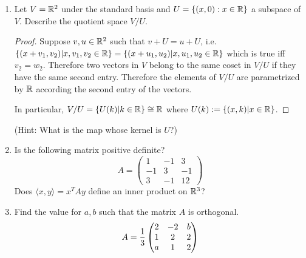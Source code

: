 \documentclass{amsart}
\begin{document}
\begin{enumerate}
(Hint: give an example of two non-invertible maps that sums to an invertible map. You might try to use some theorems to do this in terms of matrices).

\begin{proof}\color{blue}
	Consider $A=\begin{pmatrix}
		1&0\\0&0
	\end{pmatrix}$ and $B=\begin{pmatrix}
		0&0\\0&1
	\end{pmatrix}$. Both $A,B$ are singular (non-invertible), but $A+B=I$ is invertible.
	
	So the set of non-invertible maps is not closed under addition.
\end{proof}

\item Let $V=\mathbb{R}^2$ under the standard basis and $U=\{(x,0):x\in\mathbb{R}\}$ a subspace of $V$. Describe the quotient space $V/U$. 

\begin{proof}\color{blue}
	Suppose $v,u\in\mathbb{R}^2$ such that $v+U=u+U$, i.e. $\{(x+v_1,v_2)|x,v_1,v_2\in\mathbb{R}\}=\{(x+u_1,u_2)|x,u_1,u_2\in\mathbb{R}\}$ which is true iff $v_2=w_2$. Therefore two vectors in $V$ belong to the same coset in $V/U$ if they have the same second entry. Therefore the elements of $V/U$ are parametrized by $\mathbb{R}$ according the  second entry of the vectors.
	
	In particular, $V/U=\{U(k)|k\in\mathbb{R} \}\cong \mathbb{R}$ where $U(k):=\{(x,k)|x\in \mathbb{R}\}$.
\end{proof}

(Hint: What is the map whose kernel is $U$?)
%
%
\item Is the following matrix positive definite?
\[A=\begin{pmatrix}
	1&-1&3\\-1&3&-1\\3&-1&12
\end{pmatrix}\]
Does $\langle x,y\rangle =x^TAy$ define an inner product on $\mathbb{R}^3$?
\item Find the value for $a,b$ such that the matrix $A$ is orthogonal.
\[A={1\over 3}\begin{pmatrix}2&-2&b\\1&2&2\\a&1&2
\end{pmatrix}\]
\end{enumerate}


%
%
\end{document}
